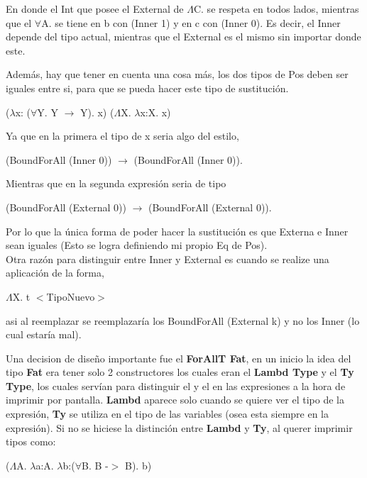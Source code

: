 \documentclass[12pt, titlepage, a4paper]{article}
\begin{document}
\begin{itemize}[label=$\bullet$]
{  En donde el Int que posee el External de $\Lambda$C. se respeta en todos lados, mientras que el $\forall$A. se tiene en b con (Inner 1) y en c con (Inner 0). 
  Es decir, el Inner depende del tipo actual, mientras que el External es el mismo sin importar donde este.

  Además, hay que tener en cuenta una cosa más, los dos tipos de Pos deben ser iguales entre si, para que se pueda hacer este tipo 
  de sustitución.
  
  \begin{center}
    ($\lambda$x: ($\forall$Y. Y $\rightarrow$ Y). x) ($\Lambda$X. $\lambda$x:X. x)
  \end{center} 

  Ya que en la primera el tipo de x seria algo del estilo,
  \begin{center}
    (BoundForAll (Inner 0)) $\rightarrow$ (BoundForAll (Inner 0)). 
  \end{center}
  Mientras que en la segunda expresión seria de tipo 
  \begin{center}
    (BoundForAll (External 0)) $\rightarrow$ (BoundForAll (External 0)). 
  \end{center}
  
  Por lo que la única forma de poder hacer la sustitución es que Externa e Inner sean iguales (Esto 
  se logra definiendo mi propio Eq de Pos). \\

  Otra razón para distinguir entre Inner y External es cuando se realize una aplicación de la forma,
  \begin{center}
    $\Lambda$X. t $<$TipoNuevo$>$
  \end{center} 
   asi al reemplazar se reemplazaría los BoundForAll (External k) y no los Inner (lo cual estaría mal).
  }
  \end{itemize}

  Una decision de diseño importante fue el \textbf{ForAllT Fat}, en un inicio la idea del tipo \textbf{Fat} era tener solo 2 
  constructores los cuales eran el \textbf{Lambd Type} y el \textbf{Ty Type}, los cuales servían para distinguir el 
  \say{$\Lambda$} y el \say{$\forall$} en las expresiones a la hora de imprimir por pantalla. \textbf{Lambd} aparece solo cuando se quiere ver el tipo de 
  la expresión, \textbf{Ty} se utiliza en el tipo de las variables (osea esta siempre en la expresión). Si no se hiciese la distinción entre \textbf{Lambd} y  \textbf{Ty}, al querer imprimir tipos como:

  \begin{center}
    ($\Lambda$A. $\lambda$a:A. $\lambda$b:($\forall$B. B -$>$ B). b)
  \end{center}  
\end{document}

